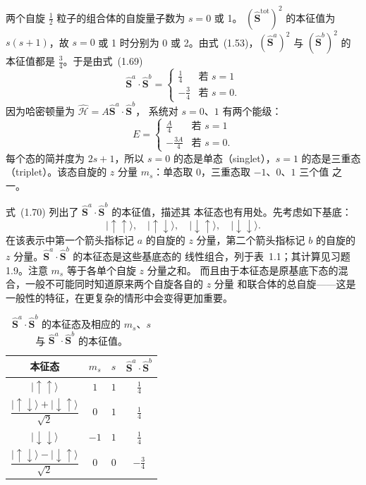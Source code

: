 两个自旋 $\frac{1}{2}$ 粒子的组合体的自旋量子数为 $s=0$ 或 1。
$(\hat{\mathbf{S}}^{\mathrm{tot}})^{2}$ 的本征值为 $s(s+1)$，故 $s=0$ 或 1 时分别为
0 或 2。由式~(1.53)，$(\hat{\mathbf{S}}^{a})^{2}$ 与 $(\hat{\mathbf{S}}^{b})^{2}$ 的
本征值都是 $\frac{3}{4}$。于是由式~(1.69)
\begin{equation*}
\hat{\mathbf{S}}^{a}\cdot\hat{\mathbf{S}}^{b} = \begin{cases} \frac{1}{4} & \text{若 } s=1\\[2pt] -\frac{3}{4} & \text{若 } s=0. \end{cases}\tag{1.70}
\end{equation*}
因为哈密顿量为 $\hat{\mathcal{H}}=A\hat{\mathbf{S}}^{a}\cdot\hat{\mathbf{S}}^{b}$，
系统对 $s=0$、$1$ 有两个能级：
\begin{equation*}
E = \begin{cases} \frac{A}{4} & \text{若 } s=1\\[2pt] -\frac{3A}{4} & \text{若 } s=0. \end{cases}\tag{1.71}
\end{equation*}
每个态的简并度为 $2s+1$，所以 $s=0$ 的态是单态（singlet），$s=1$ 的态是三重态
（triplet）。该态自旋的 $z$ 分量 $m_s$：单态取 0，三重态取 $-1$、$0$、$1$ 三个值
之一。

式~(1.70) 列出了 $\hat{\mathbf{S}}^{a}\cdot\hat{\mathbf{S}}^{b}$ 的本征值，描述其
本征态也有用处。先考虑如下基底：
\begin{equation*}
|\!\uparrow\uparrow\rangle,\quad |\!\uparrow\downarrow\rangle,\quad |\!\downarrow\uparrow\rangle,\quad |\!\downarrow\downarrow\rangle.\tag{1.72}
\end{equation*}
在该表示中第一个箭头指标记 $a$ 的自旋的 $z$ 分量，第二个箭头指标记 $b$ 的自旋的
$z$ 分量。$\hat{\mathbf{S}}^{a}\cdot\hat{\mathbf{S}}^{b}$ 的本征态是这些基底态的
线性组合，列于表~1.1；其计算见习题 1.9。注意 $m_s$ 等于各单个自旋 $z$ 分量之和。
而且由于本征态是原基底下态的混合，一般不可能同时知道原来两个自旋各自的 $z$ 分量
和联合体的总自旋——这是一般性的特征，在更复杂的情形中会变得更加重要。

\begin{table}
\centering
\caption{$\hat{\mathbf{S}}^{a}\cdot\hat{\mathbf{S}}^{b}$ 的本征态及相应的 $m_s$、$s$ 与 $\hat{\mathbf{S}}^{a}\cdot\hat{\mathbf{S}}^{b}$ 的本征值。}
\begin{tabular}{cccc}
\toprule
本征态 & $m_s$ & $s$ & $\hat{\mathbf{S}}^{a}\cdot\hat{\mathbf{S}}^{b}$ \\
\midrule
$|\!\uparrow\uparrow\rangle$ & $1$ & $1$ & $\frac{1}{4}$ \\[2pt]
$\dfrac{|\!\uparrow\downarrow\rangle+|\!\downarrow\uparrow\rangle}{\sqrt{2}}$ & $0$ & $1$ & $\frac{1}{4}$ \\[8pt]
$|\!\downarrow\downarrow\rangle$ & $-1$ & $1$ & $\frac{1}{4}$ \\[2pt]
$\dfrac{|\!\uparrow\downarrow\rangle-|\!\downarrow\uparrow\rangle}{\sqrt{2}}$ & $0$ & $0$ & $-\frac{3}{4}$ \\
\bottomrule
\end{tabular}
\end{table}

